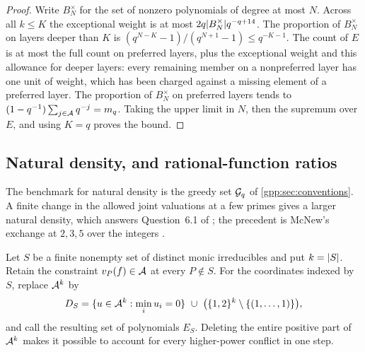 \begin{proof}
Write $B_N^\times$ for the set of nonzero polynomials of degree at most $N$. Across all
$k\le K$ the exceptional weight is at most $2q\lvert B_N^\times\rvert q^{-q+14}$. The proportion
of $B_N^\times$ on layers deeper than $K$ is $(q^{N-K}-1)/(q^{N+1}-1)\le q^{-K-1}$. The
count of $E$ is at most the full count on preferred layers, plus the exceptional weight
and this allowance for deeper layers: every remaining member on a nonpreferred layer has
one unit of weight, which has been charged against a missing element of a preferred
layer. The proportion of $B_N^\times$ on preferred layers tends to
$(1-q^{-1})\sum_{j\in\mathcal{A}}q^{-j}=m_q$. Taking the upper limit in $N$, then the supremum
over $E$, and using $K=q$ proves the bound.
\end{proof}

\subsection{Natural density, and rational-function ratios}\label{gpp:sec:natural}
{\raggedright{}}

The benchmark for natural density is the greedy set $\mathcal{G}_q$ of
\cref{gpp:sec:conventions}. A finite change in the allowed joint valuations at a few
primes gives a larger natural density, which answers Question~6.1 of
\cite{Asada2017Subsets}; the precedent is McNew's exchange at $2,3,5$ over the integers
\cite[Theorem~3.3]{McNew2015Sets}.

Let $S$ be a finite nonempty set of distinct monic irreducibles and put $k=\lvert S\rvert$.
Retain the constraint $v_P(f)\in\mathcal{A}$ at every $P\notin S$. For the coordinates indexed
by $S$, replace $\mathcal{A}^k$ by
\[
 D_S=\{u\in\mathcal{A}^k:\min_iu_i=0\}\ \cup\
 \bigl(\{1,2\}^k\setminus\{(1,\ldots,1)\}\bigr),
\]
and call the resulting set of polynomials $E_S$. Deleting the entire positive part of
$\mathcal{A}^k$ makes it possible to account for every higher-power conflict in one step.


